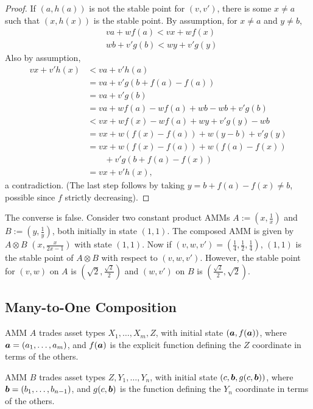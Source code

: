 \begin{proof}
If $(a,h(a))$ is not the stable point for $(v,v')$,
there is some $x \neq a$ such that $(x,h(x))$ is the stable point.
By assumption, for $x \neq a$ and $y \neq b$,
\begin{align*}
    &v a + wf(a) < v x + w f(x)\\
    &wb + v'g(b) < wy + v'g(y)
\end{align*}
Also by assumption,
\begin{align*}
  vx + v'h(x)
  &< va + v'h(a)\\
  &= va +v'g(b + f(a) - f(a))\\
  &= va + v'g(b) \\
  &= va + wf(a) - wf(a) + wb - wb + v'g(b) \\
    &< vx + wf(x) - wf(a) + wy + v'g(y) - w b\\
    &= vx + w(f(x) - f(a)) + w(y - b) + v'g(y) \\
    &= vx + w(f(x) - f(a)) + w(f(a) - f(x))\\
    &\quad \quad + v'g(b + f(a) - f(x))\\
    &= vx +v'h(x),
\end{align*}
a contradiction.
(The last step follows by taking $y = b + f(a) - f(x) \neq b$,
possible since $f$ strictly decreasing).
\end{proof}

The converse is false.
Consider two constant product AMMs $A := (x,\frac{1}{x})$
and $B := (y,\frac{1}{y})$,
both initially in state $(1,1)$.
The composed AMM is given by $A \otimes B$ $(x,\frac{x}{2x-1})$ with state $(1,1)$.
Now if $(v,w,v') = (\frac{1}{4},\frac{1}{2},\frac{1}{4})$,
$(1,1)$ is the stable point of $A \otimes B$ with respect to $(v,w,v')$.
However, the stable point for $(v,w)$ on $A$ is
$(\sqrt{2},\frac{\sqrt{2}}{2})$
and $(w,v')$ on $B$ is $(\frac{\sqrt{2}}{2},\sqrt{2})$.


\subsection{Many-to-One Composition}
AMM $A$ trades asset types $X_1, \ldots, X_m, Z$,
with initial state $({\boldsymbol a}, f({\boldsymbol a}))$,
where ${\boldsymbol a}=(a_1,\ldots,a_m)$,
and $f({\boldsymbol a})$ is the explicit function
defining the $Z$ coordinate in terms of the others.

AMM $B$ trades asset types $Z, Y_1, \ldots, Y_n$,
with initial state $(c,{\boldsymbol b}, g(c,{\boldsymbol b}))$,
where ${\boldsymbol b}=(b_1,\ldots,b_{n-1})$,
and $g(c,{\boldsymbol b})$ is the function
defining the $Y_n$ coordinate in terms of the others.

